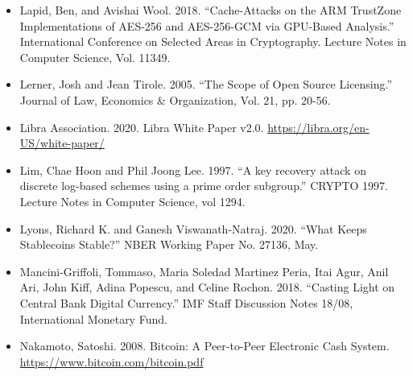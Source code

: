 \documentclass[10pt,spanish]{article}
\begin{document}
\begin{itemize}
\item Lapid, Ben, and Avishai Wool. 2018. ``Cache-Attacks on the ARM TrustZone
Implementations of AES-256 and AES-256-GCM via GPU-Based Analysis.''
International Conference on Selected Areas in Cryptography. Lecture
Notes in Computer Science, Vol. 11349.
\end{itemize}

\begin{itemize}
\item Lerner, Josh and Jean Tirole. 2005. ``The Scope of Open Source
Licensing.'' Journal of Law, Economics \& Organization, Vol. 21, pp.
20-56.
\end{itemize}

\begin{itemize}
\item Libra Association. 2020. Libra White Paper v2.0.
\href{https://libra.org/en-US/white-paper/}{{https://libra.org/en-US/white-paper/}}
\end{itemize}

\begin{itemize}
\item Lim, Chae Hoon and Phil Joong Lee. 1997. ``A key recovery attack on
discrete log-based schemes using a prime order subgroup.'' CRYPTO 1997.
Lecture Notes in Computer Science, vol 1294.
\end{itemize}

\begin{itemize}
\item Lyons, Richard K. and Ganesh Viswanath-Natraj. 2020. ``What Keeps
Stablecoins Stable?'' NBER Working Paper No. 27136, May.
\end{itemize}

\begin{itemize}
\item Mancini-Griffoli, Tommaso, Maria Soledad Martinez Peria, Itai Agur, Anil
Ari, John Kiff, Adina Popescu, and Celine Rochon. 2018. ``Casting Light
on Central Bank Digital Currency.'' IMF Staff Discussion Notes 18/08,
International Monetary Fund.
\end{itemize}

\begin{itemize}
\item Nakamoto, Satoshi. 2008. Bitcoin: A Peer-to-Peer Electronic Cash System.
\href{https://www.bitcoin.com/bitcoin.pdf}{{https://www.bitcoin.com/bitcoin.pdf}}
\end{itemize}
\end{document}
